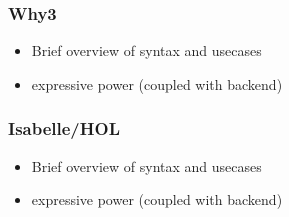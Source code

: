 \subsubsection{Why3}
\begin{itemize}
  \item Brief overview of syntax and usecases
  \item expressive power (coupled with backend)
\end{itemize}

\subsubsection{Isabelle/HOL}
\begin{itemize}
  \item Brief overview of syntax and usecases
  \item expressive power (coupled with backend)
\end{itemize}
